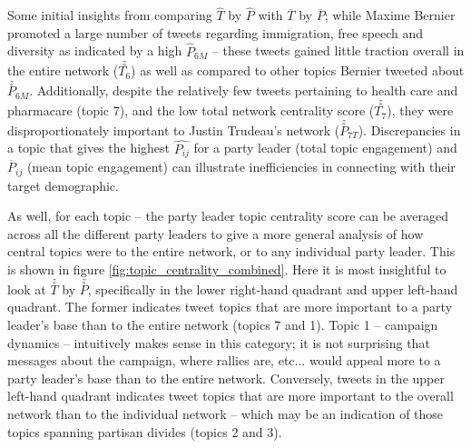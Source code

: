 Some initial insights from comparing \textbf{$\hat{T}$} by \textbf{$\hat{P}$}
with \textbf{$\overline{T}$} by \textbf{$\overline{P}$}; while Maxime Bernier
promoted a large number of tweets regarding immigration, free speech and
diversity as indicated by a high $\hat{P}_{6M}$ -- these tweets gained little
traction overall in the entire network ($\stackrel{z}{T_{6}}$) as well as
compared to other topics Bernier tweeted about $\stackrel{z}{P}_{6M}$.
Additionally, despite the relatively few tweets pertaining to health care and
pharmacare (topic 7), and the low total network centrality score
($\stackrel{z}{T_{7}}$), they were disproportionately important to Justin
Trudeau's network ($\stackrel{z}{P}_{7T}$). Discrepancies in a topic that gives
the highest $\hat{P_{ij}}$ for a party leader (total topic engagement) and
$\overline{P}_{ij}$  (mean topic engagement) can illustrate inefficiencies in
connecting with their target demographic.

As well, for each topic -- the party leader topic centrality score can be
averaged across all the different party leaders to give a more general analysis
of how central topics were to the entire network, or to any individual party
leader. This is shown in figure \ref{fig:topic_centrality_combined}. Here it is
most insightful to look at \textbf{$\stackrel{z}{T}$} by
\textbf{$\stackrel{z}{P}$}, specifically in the lower right-hand quadrant and
upper left-hand quadrant. The former indicates tweet topics that are more
important to a party leader's base than to the entire network (topics 7 and 1).
Topic 1 -- campaign dynamics -- intuitively makes sense in this category; it is
not surprising that messages about the campaign, where rallies are, etc... would
appeal more to a party leader's base than to the entire network. Conversely,
tweets in the upper left-hand quadrant indicates tweet topics that are more
important to the overall network than to the individual network -- which may be
an indication of those topics spanning partisan divides (topics 2 and 3).

